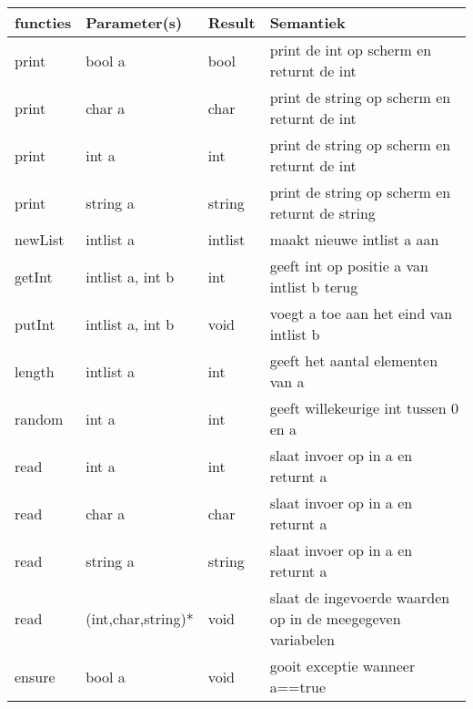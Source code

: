 \begin{tabular*}{\textwidth}{@{\extracolsep{\fill}} |l | l | l | l |}
	\hline
		functies	    &   Parameter(s)	&	Result	    & Semantiek\\
	\hline
        print           &   bool a          &   bool        & print de int op scherm en returnt de int\\
        print           &   char a          &   char        & print de string op scherm en returnt de int\\
        print           &   int a           &   int         & print de string op scherm en returnt de int\\
        print           &   string a        &   string      & print de string op scherm en returnt de string\\

        newList         &   intlist a       &   intlist     & maakt nieuwe intlist a aan\\
        getInt          &   intlist a, int b&   int         & geeft int op positie a van intlist b terug\\
        putInt          &   intlist a, int b&   void        & voegt a toe aan het eind van intlist b\\
        length          &   intlist a       &   int         & geeft het aantal elementen van a\\

        random          &   int a           &   int         & geeft willekeurige int tussen 0 en a\\

        read            &   int a           &   int         & slaat invoer op in a en returnt a\\
        read            &   char a          &   char        & slaat invoer op in a en returnt a\\
        read            &   string a        &   string      & slaat invoer op in a en returnt a\\
        read            &   (int,char,string)*  & void      & slaat de ingevoerde waarden op in de meegegeven variabelen\\

        ensure          &   bool a          &   void        & gooit exceptie wanneer a==true\\
	\hline
\end{tabular*}        
